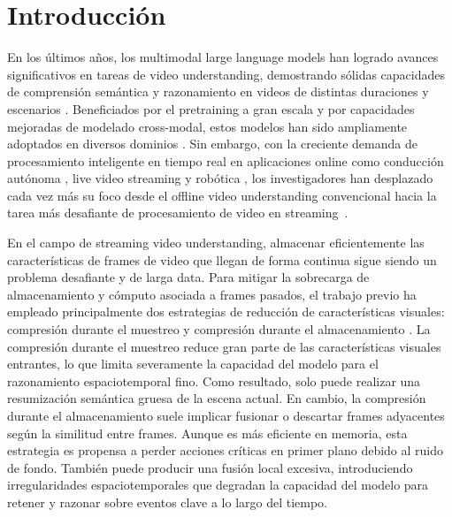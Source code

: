 \section{Introducción}
\label{sec:Introduction}

En los últimos años, los multimodal large language models han logrado avances significativos en tareas de video understanding, demostrando sólidas capacidades de comprensión semántica y razonamiento en videos de distintas duraciones y escenarios \cite{li2023videochat,song2024moviechat,li2024mvbench,li2024llamavid}. Beneficiados por el pretraining a gran escala y por capacidades mejoradas de modelado cross-modal, estos modelos han sido ampliamente adoptados en diversos dominios \cite{li2024llavaov,liu2024oryx,qwen2vl,wang2025internvideo2_5}. Sin embargo, con la creciente demanda de procesamiento inteligente en tiempo real en aplicaciones online como conducción autónoma \cite{shao2024lmdrive}, live video streaming \cite{chen2025livecc} y robótica \cite{zhu2024spa}, los investigadores han desplazado cada vez más su foco desde el offline video understanding convencional hacia la tarea más desafiante de procesamiento de video en streaming~\cite{chen2024videollmonline,huang2024videochatonline,qian2024videostreaming}.


En el campo de streaming video understanding, almacenar eficientemente las características de frames de video que llegan de forma continua sigue siendo un problema desafiante y de larga data. Para mitigar la sobrecarga de almacenamiento y cómputo asociada a frames pasados, el trabajo previo ha empleado principalmente dos estrategias de reducción de características visuales: compresión durante el muestreo \cite{chen2024videollmonline,qian2024videostreaming,yao2025timechatonline} y compresión durante el almacenamiento \cite{song2024moviechat,zhang2024flashvstream,huang2024videochatonline}. La compresión durante el muestreo reduce gran parte de las características visuales entrantes, lo que limita severamente la capacidad del modelo para el razonamiento espaciotemporal fino. Como resultado, solo puede realizar una resumización semántica gruesa de la escena actual. En cambio, la compresión durante el almacenamiento suele implicar fusionar o descartar frames adyacentes según la similitud entre frames. Aunque es más eficiente en memoria, esta estrategia es propensa a perder acciones críticas en primer plano debido al ruido de fondo. También puede producir una fusión local excesiva, introduciendo irregularidades espaciotemporales que degradan la capacidad del modelo para retener y razonar sobre eventos clave a lo largo del tiempo.


